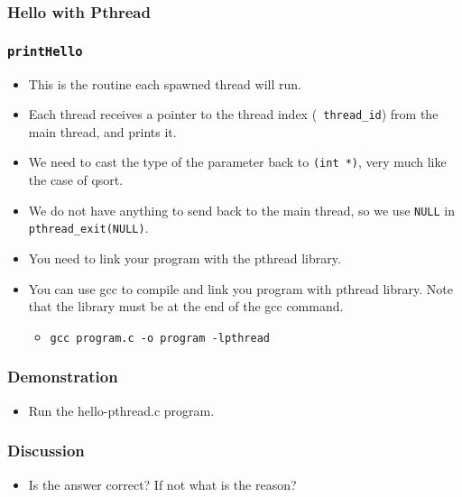 \documentclass{beamer}
\begin{document}
\begin{frame}
\frametitle{Hello with Pthread}
\end{frame}

\begin{frame}
\frametitle{\tt printHello}
\begin{itemize}
\item This is the routine each spawned thread will run.
\item Each thread receives a pointer to the thread index ({\tt
  thread\_id}) from the main thread, and prints it.
\item We need to cast the type of the parameter back to {\tt (int *)},
  very much like the case of qsort.
\item We do not have anything to send back to the main thread, so we
  use {\tt NULL} in {\tt pthread\_exit(NULL)}.
\end{itemize}
\end{frame}

\begin{frame}
\begin{itemize}
\frametitle{Compile and Link}
\item You need to link your program with the pthread library.
\item You can use gcc to compile and link you program with pthread
  library.  Note that the library must be at the end of the gcc
  command.
\begin{itemize}
\item {\tt gcc program.c -o program -lpthread}
\end{itemize}
\end{itemize}
\end{frame}

\begin{frame}
\frametitle{Demonstration}
\begin{itemize}
\item Run the hello-pthread.c program.
\end{itemize}
\end{frame}

\begin{frame}
\frametitle{Discussion}
\begin{itemize}
\item Is the answer correct? If not what is the reason?
\end{itemize}
\end{frame}
\end{document}
